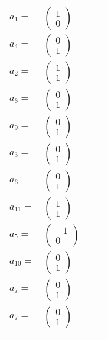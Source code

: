 \documentclass[1p]{elsarticle_modified}
\theoremstyle{definition}
\begin{document}
\begin{tabular}{m{7pt} m{180pt} m{7pt} m{180pt} }
\flushright $a_{1}=$&$\begin{pmatrix}1\\0\end{pmatrix}$ \\
\flushright $a_{4}=$&$\begin{pmatrix}0\\1\end{pmatrix}$ \\
\flushright $a_{2}=$&$\begin{pmatrix}1\\1\end{pmatrix}$ \\
\flushright $a_{8}=$&$\begin{pmatrix}0\\1\end{pmatrix}$ \\
\flushright $a_{9}=$&$\begin{pmatrix}0\\1\end{pmatrix}$ \\
\flushright $a_{3}=$&$\begin{pmatrix}0\\1\end{pmatrix}$ \\
\flushright $a_{6}=$&$\begin{pmatrix}0\\1\end{pmatrix}$ \\
\flushright $a_{11}=$&$\begin{pmatrix}1\\1\end{pmatrix}$ \\
\flushright $a_{5}=$&$\begin{pmatrix}-1\\0\end{pmatrix}$ \\
\flushright $a_{10}=$&$\begin{pmatrix}0\\1\end{pmatrix}$ \\
\flushright $a_{7}=$&$\begin{pmatrix}0\\1\end{pmatrix}$\\ \flushright $a_{7}=$&$\begin{pmatrix}0\\1\end{pmatrix}$\\&\end{tabular}
\end{document}
